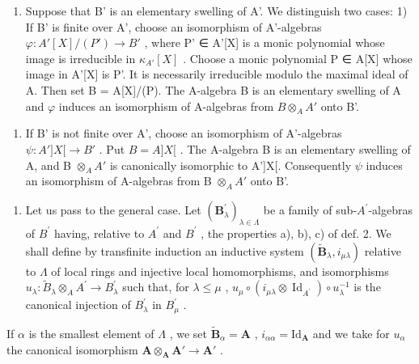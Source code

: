 \begin{enumerate}
\def\labelenumi{\Alph{enumi})}
\tightlist
\item
  Suppose that B' is an elementary swelling of A'. We distinguish two cases: 1) If B' is finite over A', choose an isomorphism of A'-algebras \(\varphi: A'[X]/(P') \to B'\) , where P' ∈ A'{[}X{]} is a monic polynomial whose image is irreducible in \(\kappa_{A'}[X]\) . Choose a monic polynomial P ∈ A{[}X{]} whose image in A'{[}X{]} is P'. It is necessarily irreducible modulo the maximal ideal of A. Then set B = A{[}X{]}/(P). The A-algebra B is an elementary swelling of A and \(\varphi\) induces an isomorphism of A-algebras from \(B \otimes_{A} A'\) onto B'.
\end{enumerate}

\begin{enumerate}
\def\labelenumi{\arabic{enumi})}
\setcounter{enumi}{1}
\tightlist
\item
  If B' is not finite over A', choose an isomorphism of A'-algebras \(\psi : A']X[\to B'\) . Put \(B = A]X[\) . The A-algebra B is an elementary swelling of A, and B \(\otimes_{A} A'\) is canonically isomorphic to A'{]}X{[}. Consequently \(\psi\) induces an isomorphism of A-algebras from B \(\otimes_{A} A'\) onto B'.
\end{enumerate}

\begin{enumerate}
\def\labelenumi{\Alph{enumi})}
\setcounter{enumi}{1}
\tightlist
\item
  Let us pass to the general case. Let \((\mathbf{B}_{\lambda}^{\prime})_{\lambda\in\Lambda}\) be a family of sub-\(A^{\prime}\)-algebras of \(B^{\prime}\) having, relative to \(A^{\prime}\) and \(B^{\prime}\) , the properties a), b), c) of def. 2. We shall define by transfinite induction an inductive system \((\widetilde{\mathbf{B}}_{\lambda}, i_{\mu\lambda})\) relative to \(\Lambda\) of local rings and injective local homomorphisms, and isomorphisms \(u_{\lambda}: \widetilde{B}_{\lambda} \otimes_{A} A^{\prime} \to B_{\lambda}^{\prime}\) such that, for \(\lambda \leqslant \mu\) , \(u_{\mu} \circ (i_{\mu\lambda} \otimes \operatorname{Id}_{A^{\prime}}) \circ u_{\lambda}^{-1}\) is the canonical injection of \(B_{\lambda}^{\prime}\) in \(B_{\mu}^{\prime}\) .
\end{enumerate}

If \(\alpha\) is the smallest element of \(\Lambda\) , we set \(\tilde{\mathbf{B}}_{\alpha} = \mathbf{A}\) , \(i_{\alpha \alpha} = \mathrm{Id}_{\mathbf{A}}\) and we take for \(u_{\alpha}\) the canonical isomorphism \(\mathbf{A} \otimes_{\mathbf{A}} \mathbf{A}' \to \mathbf{A}'\) .

